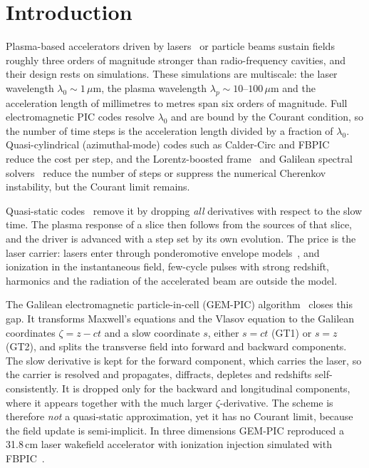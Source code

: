 \documentclass[preprint,12pt]{elsarticle}
\begin{document}
\linenumbers

\section{Introduction}\label{sec:intro}

Plasma-based accelerators driven by lasers~\cite{Tajima1979,Esarey2009} or particle beams sustain fields roughly three orders of magnitude stronger than radio-frequency cavities, and their design rests on simulations. These simulations are multiscale: the laser wavelength $\lambda_0 \sim 1\,\mu$m, the plasma wavelength $\lambda_p \sim 10$--$100\,\mu$m and the acceleration length of millimetres to metres span six orders of magnitude. Full electromagnetic PIC codes resolve $\lambda_0$ and are bound by the Courant condition, so the number of time steps is the acceleration length divided by a fraction of $\lambda_0$. Quasi-cylindrical (azimuthal-mode) codes such as Calder-Circ and FBPIC~\cite{Lifschitz2009,Lehe2016} reduce the cost per step, and the Lorentz-boosted frame~\cite{Vay2007} and Galilean spectral solvers~\cite{Lehe2016b} reduce the number of steps or suppress the numerical Cherenkov instability, but the Courant limit remains.

Quasi-static codes~\cite{Sprangle1990,Mora1997,Lotov2003,Huang2006,Mehrling2014,Li2021,Diederichs2022,FerranPousa2019} remove it by dropping \emph{all} derivatives with respect to the slow time. The plasma response of a slice then follows from the sources of that slice, and the driver is advanced with a step set by its own evolution. The price is the laser carrier: lasers enter through ponderomotive envelope models~\cite{Mora1997,Benedetti2018}, and ionization in the instantaneous field, few-cycle pulses with strong redshift, harmonics and the radiation of the accelerated beam are outside the model.

The Galilean electromagnetic particle-in-cell (GEM-PIC) algorithm~\cite{GEMPIC} closes this gap. It transforms Maxwell's equations and the Vlasov equation to the Galilean coordinates $\zeta = z - ct$ and a slow coordinate $s$, either $s = ct$ (GT1) or $s = z$ (GT2), and splits the transverse field into forward and backward components. The slow derivative is kept for the forward component, which carries the laser, so the carrier is resolved and propagates, diffracts, depletes and redshifts self-consistently. It is dropped only for the backward and longitudinal components, where it appears together with the much larger $\zeta$-derivative. The scheme is therefore \emph{not} a quasi-static approximation, yet it has no Courant limit, because the field update is semi-implicit. In three dimensions GEM-PIC reproduced a 31.8\,cm laser wakefield accelerator with ionization injection simulated with FBPIC~\cite{GEMPIC}.
\end{document}

